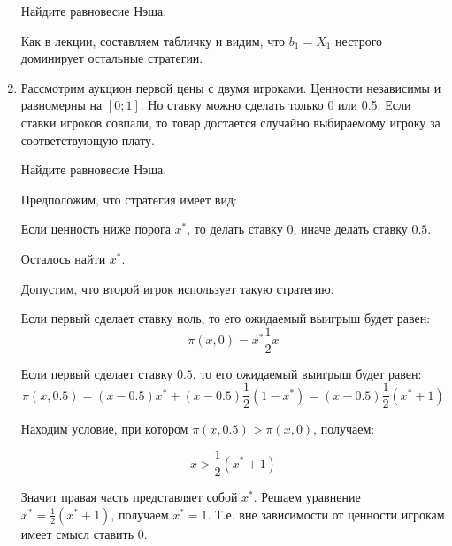 \begin{enumerate}
Найдите равновесие Нэша.


Как в лекции, составляем табличку и видим, что $ b_{1}=X_{1} $ нестрого доминирует остальные стратегии.

\item Рассмотрим аукцион первой цены с двумя игроками. Ценности независимы и равномерны на $ [0;1] $. Но ставку можно сделать только 0 или 0.5. Если ставки игроков совпали, то товар достается случайно выбираемому игроку за соответствующую плату. 

Найдите равновесие Нэша.

Предположим, что стратегия имеет вид:

Если ценность ниже порога $ x^{*} $, то делать ставку 0, иначе делать ставку $ 0.5 $.

Осталось найти $ x^{*} $.

Допустим, что второй игрок использует такую стратегию.

Если первый сделает ставку ноль, то его ожидаемый выигрыш будет равен:
\begin{equation}
\pi(x,0)=x^{*}\frac{1}{2}x
\end{equation}

Если первый сделает ставку $0.5$, то его ожидаемый выигрыш будет равен:
\begin{equation}
\pi(x,0.5)=(x-0.5)x^{*}+(x-0.5)\frac{1}{2}(1-x^{*})=(x-0.5)\frac{1}{2}(x^{*}+1)
\end{equation}

Находим условие, при котором $ \pi(x,0.5)>\pi(x,0) $, получаем:

\begin{equation}
x>\frac{1}{2}(x^{*}+1)
\end{equation}

Значит правая часть представляет собой $ x^{*} $. Решаем уравнение $x^{*}=\frac{1}{2}(x^{*}+1)  $, получаем $ x^{*}=1 $. Т.е. вне зависимости от ценности игрокам имеет смысл ставить 0.


\end{enumerate}

